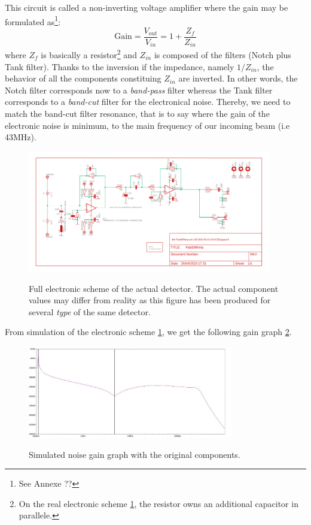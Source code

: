 \documentclass[12pt]{report}
\begin{document}
This circuit is called a non-inverting voltage amplifier where the gain may be formulated as\footnote{See Annexe ??}:
\begin{equation}
\textrm{Gain} = \frac{V_{out}}{V_{in}} = 1 + \frac{Z_{f}}{Z_{in}}
\end{equation}
where $Z_f$ is basically a resistor\footnote{On the real electronic scheme \ref{fig:elec-scheme}, the resistor owns an additional capacitor in parallele.} and $Z_{in}$ is composed of the filters (Notch plus Tank filter). Thanks to the inversion if the impedance, namely $1/Z_{in}$, the behavior of all the components constituing $Z_{in}$ are inverted. In other words, the Notch filter corresponds now to a \textit{band-pass} filter whereas the Tank filter corresponds to a \textit{band-cut} filter for the electronical noise. Thereby, we need to match the band-cut filter resonance, that is to say where the gain of the electronic noise is minimum, to the main frequency of our incoming beam (i.e 43MHz).

\begin{figure}[h!]
\caption{Full electronic scheme of the actual detector. The actual component values may differ from reality as this figure has been produced for several \textit{type} of the same detector.}
\centering
\includegraphics[width=0.95\textwidth]{elec-scheme}
\label{fig:elec-scheme}
\end{figure}

From simulation of the electronic scheme \ref{fig:elec-scheme}, we get the following gain graph \ref{fig:noise_gain_opamp_original}. 

\begin{figure}[h!]
\caption{Simulated noise gain graph with the original components.}
\centering
\includegraphics[width=0.8\textwidth]{noise_gain_opamp_original}
\label{fig:noise_gain_opamp_original}
\end{figure}
\end{document}
